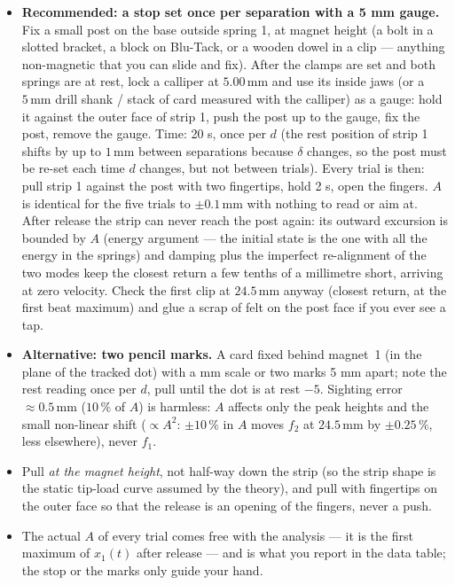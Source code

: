 \documentclass[11pt,a4paper]{article}
\newcommand{\un}[1]{\,\mathrm{#1}}
\begin{document}
\begin{itemize}[leftmargin=1.6em,itemsep=1pt]
\item \textbf{Recommended: a stop set once per separation with a 5 mm gauge.} Fix a small post on the base outside spring 1, at magnet height (a bolt in a slotted bracket, a block on Blu-Tack, or a wooden dowel in a clip --- anything non-magnetic that you can slide and fix). After the clamps are set and both springs are at rest, lock a calliper at $5.00\un{mm}$ and use its inside jaws (or a $5\un{mm}$ drill shank / stack of card measured with the calliper) as a gauge: hold it against the outer face of strip 1, push the post up to the gauge, fix the post, remove the gauge. Time: 20 s, once per $d$ (the rest position of strip 1 shifts by up to $1\un{mm}$ between separations because $\delta$ changes, so the post must be re-set each time $d$ changes, but not between trials). Every trial is then: pull strip 1 against the post with two fingertips, hold 2 s, open the fingers. $A$ is identical for the five trials to $\pm0.1\un{mm}$ with nothing to read or aim at. After release the strip can never reach the post again: its outward excursion is bounded by $A$ (energy argument --- the initial state is the one with all the energy in the springs) and damping plus the imperfect re-alignment of the two modes keep the closest return a few tenths of a millimetre short, arriving at zero velocity. Check the first clip at $24.5\un{mm}$ anyway (closest return, at the first beat maximum) and glue a scrap of felt on the post face if you ever see a tap.
\item \textbf{Alternative: two pencil marks.} A card fixed behind magnet~1 (in the plane of the tracked dot) with a mm scale or two marks 5 mm apart; note the rest reading once per $d$, pull until the dot is at rest $-5$. Sighting error $\approx0.5\un{mm}$ ($10\,\%$ of $A$) is harmless: $A$ affects only the peak heights and the small non-linear shift ($\propto A^2$: $\pm10\,\%$ in $A$ moves $f_2$ at $24.5\un{mm}$ by $\pm0.25\,\%$, less elsewhere), never $f_1$.
\item Pull \emph{at the magnet height}, not half-way down the strip (so the strip shape is the static tip-load curve assumed by the theory), and pull with fingertips on the outer face so that the release is an opening of the fingers, never a push.
\item The actual $A$ of every trial comes free with the analysis --- it is the first maximum of $x_1(t)$ after release --- and is what you report in the data table; the stop or the marks only guide your hand.
\end{itemize}
\end{document}
